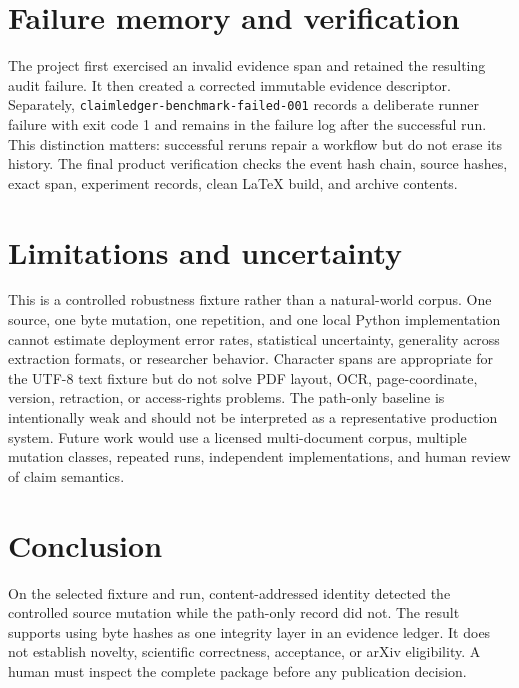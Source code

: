 \documentclass[11pt]{article}
\begin{document}
\section{Failure memory and verification}
The project first exercised an invalid evidence span and retained the resulting audit failure. It then created a corrected immutable evidence descriptor. Separately, \texttt{claimledger-benchmark-failed-001} records a deliberate runner failure with exit code 1 and remains in the failure log after the successful run. This distinction matters: successful reruns repair a workflow but do not erase its history. The final product verification checks the event hash chain, source hashes, exact span, experiment records, clean LaTeX build, and archive contents.

\section{Limitations and uncertainty}
This is a controlled robustness fixture rather than a natural-world corpus. One source, one byte mutation, one repetition, and one local Python implementation cannot estimate deployment error rates, statistical uncertainty, generality across extraction formats, or researcher behavior. Character spans are appropriate for the UTF-8 text fixture but do not solve PDF layout, OCR, page-coordinate, version, retraction, or access-rights problems. The path-only baseline is intentionally weak and should not be interpreted as a representative production system. Future work would use a licensed multi-document corpus, multiple mutation classes, repeated runs, independent implementations, and human review of claim semantics.

\section{Conclusion}
On the selected fixture and run, content-addressed identity detected the controlled source mutation while the path-only record did not. The result supports using byte hashes as one integrity layer in an evidence ledger. It does not establish novelty, scientific correctness, acceptance, or arXiv eligibility. A human must inspect the complete package before any publication decision.



\end{document}

